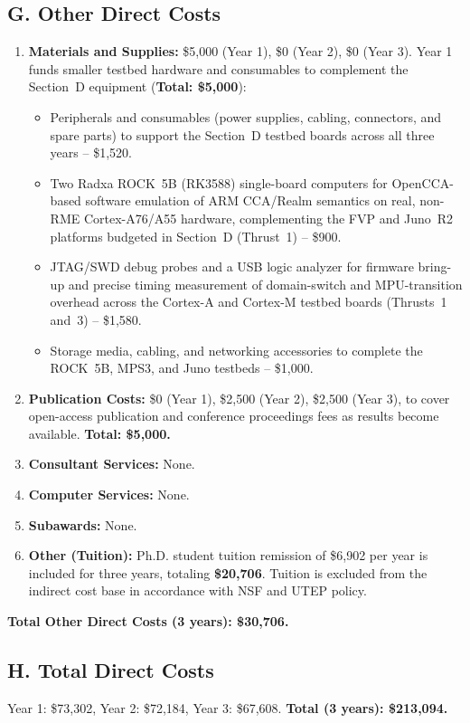 \documentclass[11pt,onecolumn]{article}
\begin{document}
\subsection*{G. Other Direct Costs}
\begin{enumerate}[label=\arabic*.,leftmargin=1.6em]
	\item \textbf{Materials and Supplies:} \$5,000 (Year 1), \$0 (Year 2), \$0 (Year 3). Year 1
	funds smaller testbed hardware and consumables to complement the Section~D equipment (\textbf{Total: \$5,000}):
	\begin{itemize}
		\item Peripherals and consumables (power supplies, cabling, connectors, and spare
		parts) to support the Section~D testbed boards across all three years -- \$1,520.
		\item Two Radxa ROCK~5B (RK3588) single-board computers for OpenCCA-based software
		emulation of ARM CCA/Realm semantics on real, non-RME Cortex-A76/A55 hardware,
		complementing the FVP and Juno~R2 platforms budgeted in Section~D (Thrust~1)
		-- \$900.
		\item JTAG/SWD debug probes and a USB logic analyzer for firmware bring-up and
		precise timing measurement of domain-switch and MPU-transition overhead across the
		Cortex-A and Cortex-M testbed boards (Thrusts~1 and~3) -- \$1,580.
		\item Storage media, cabling, and networking accessories to complete the
		ROCK~5B, MPS3, and Juno testbeds -- \$1,000.
	\end{itemize}
	
	\item \textbf{Publication Costs:} \$0 (Year 1), \$2,500 (Year 2), \$2,500 (Year 3), to
	cover open-access publication and conference proceedings fees as results become
	available. \textbf{Total: \$5,000.}
	\item \textbf{Consultant Services:} None.
	\item \textbf{Computer Services:} None.
	\item \textbf{Subawards:} None.
	\item \textbf{Other (Tuition):} Ph.D. student tuition remission of \$6,902 per year is
	included for three years, totaling \textbf{\$20,706}. Tuition is excluded from the
	indirect cost base in accordance with NSF and UTEP policy.
\end{enumerate}
\textbf{Total Other Direct Costs (3 years): \$30,706.}

\subsection*{H. Total Direct Costs}
Year 1: \$73,302, Year 2: \$72,184, Year 3: \$67,608. \textbf{Total (3 years): \$213,094.}
\end{document}

